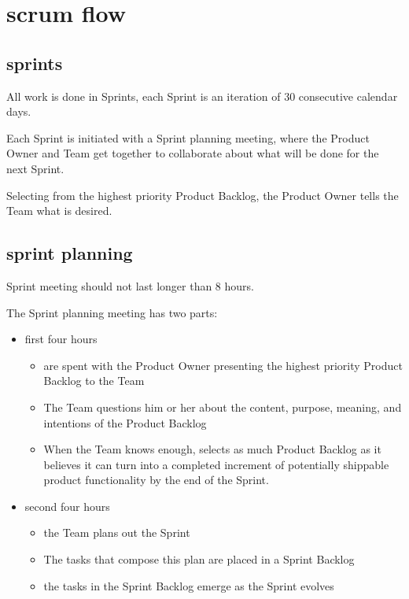 \section{scrum flow}

\subsection*{sprints}

All work is done in Sprints, each Sprint is an iteration of 30 consecutive calendar days.

Each Sprint is initiated with a Sprint planning meeting, where the Product Owner and Team get together to collaborate about what will be done for the next Sprint.

Selecting from the highest priority Product Backlog, the Product Owner tells the Team what is desired.



\subsection*{sprint planning}

Sprint meeting should not last longer than 8 hours.

The Sprint planning meeting has two parts: 

\begin{itemize}
  \item first four hours
  \begin{itemize}
    \item are spent with the Product Owner presenting the highest priority Product Backlog to the Team
    \item The Team questions him or her about the content, purpose, meaning, and intentions of the Product Backlog
    \item When the Team knows enough, selects as much Product Backlog as it believes it can turn into a completed increment of potentially shippable product functionality by the end of the Sprint.
  \end{itemize}
  \item second four hours
  \begin{itemize}
    \item the Team plans out the Sprint
    \item The tasks that compose this plan are placed in a Sprint Backlog
    \item the tasks in the Sprint Backlog emerge as the Sprint evolves
  \end{itemize}
\end{itemize}

